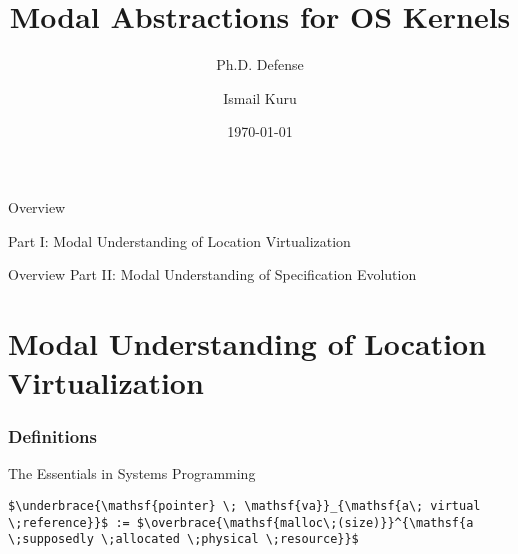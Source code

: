 \documentclass[aspectratio=169,xcolor=dvipsnames]{beamer}
\title{Modal Abstractions for OS Kernels}
\subtitle{Ph.D. Defense}
\author{Ismail Kuru}
\institute
{
    Department of Computer Science \\
    Drexel University %
}
\date{\today} %
\newcommand{\makepart}[1]{ %
\part{#1} \frame{\partpage}
}
\begin{document}
\begin{frame}
    \titlepage
\end{frame}

\begin{frame}{Overview}

Part I: Modal Understanding of Location Virtualization
\tableofcontents[part=1]

\end{frame}
\begin{frame}{Overview}
Part II: Modal Understanding of Specification Evolution
\tableofcontents[part=2]
    
\end{frame}
\makepart{Modal Understanding of Location Virtualization}


\section{Definitions}

\begin{frame}[fragile]{The Essentials in Systems Programming}
\begin{lstlisting}[style=CStyle,mathescape]
    $\underbrace{\mathsf{pointer} \; \mathsf{va}}_{\mathsf{a\; virtual \;reference}}$ := $\overbrace{\mathsf{malloc\;(size)}}^{\mathsf{a \;supposedly \;allocated \;physical \;resource}}$
\end{lstlisting}
\end{frame}
\end{document}
